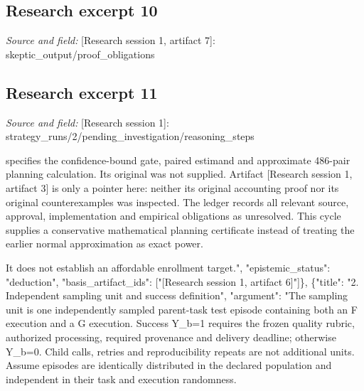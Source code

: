 \documentclass[11pt]{article}
\begin{document}
\subsection{Research excerpt 10}
\textit{Source and field: }[Research session 1, artifact 7]: skeptic\_output/proof\_obligations\par
["Cycle 3 steps 4\textendash{}7 support the conditional uniqueness argument; implementation must establish their transaction, acknowledgement and one-shot-continuation premises.", "Cycle 3 steps 10, 12\textendash{}14 support conditional coverage during ambiguity; an operational finality predicate must cover delayed sending and all applicable financial scopes.", "Cycle 3 step 9 must be corrected so recovery preserves both replay rejection and unresolved financial exposure.", "Exact refinement correspondence requires the absent cycle-2 definitions; no prior-cycle proof obligation is discharged from its pointer.", "Project achievement additionally requires the source-grounded four-baseline comparison, governance review, transparent dated costs, measurements and bounded pilot retained in the ledger."]

\subsection{Research excerpt 11}
\textit{Source and field: }[Research session 1]: strategy\_runs/2/pending\_investigation/reasoning\_steps\par
[\{"title": "1. Evidence boundary and the planning gap", "argument": "The supplied bounded extract of [Research session 1, artifact 6] specifies the confidence-bound gate, paired estimand and approximate 486-pair planning calculation. Its original was not supplied. Artifact [Research session 1, artifact 3] is only a pointer here: neither its original accounting proof nor its original counterexamples was inspected. The ledger records all relevant source, approval, implementation and empirical obligations as unresolved. This cycle supplies a conservative mathematical planning certificate instead of treating the earlier normal approximation as exact power.

It does not establish an affordable enrollment target.", "epistemic\_status": "deduction", "basis\_artifact\_ids": ["[Research session 1, artifact 6]"]\}, \{"title": "2. Independent sampling unit and success definition", "argument": "The sampling unit is one independently sampled parent-task test episode containing both an F execution and a G execution. Success Y\_b=1 requires the frozen quality rubric, authorized processing, required provenance and delivery deadline; otherwise Y\_b=0. Child calls, retries and reproducibility repeats are not additional units. Assume episodes are identically distributed in the declared population and independent in their task and execution randomness.
\end{document}
